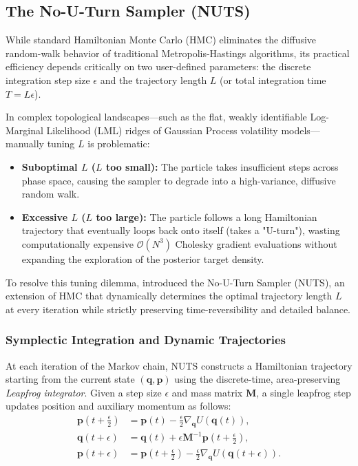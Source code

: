 \documentclass[12pt,oneside]{report}
\theoremstyle{definition}
\theoremstyle{remark}
\begin{document}
\subsection{The No-U-Turn Sampler (NUTS)}
\label{subsec:nuts}

While standard Hamiltonian Monte Carlo (HMC) eliminates the diffusive random-walk behavior of traditional Metropolis-Hastings algorithms, its practical efficiency depends critically on two user-defined parameters: the discrete integration step size $\epsilon$ and the trajectory length $L$ (or total integration time $T = L\epsilon$). 

In complex topological landscapes—such as the flat, weakly identifiable Log-Marginal Likelihood (LML) ridges of Gaussian Process volatility models—manually tuning $L$ is problematic:
\begin{itemize}
    \item \textbf{Suboptimal $L$ ($L$ too small):} The particle takes insufficient steps across phase space, causing the sampler to degrade into a high-variance, diffusive random walk.
    \item \textbf{Excessive $L$ ($L$ too large):} The particle follows a long Hamiltonian trajectory that eventually loops back onto itself (takes a "U-turn"), wasting computationally expensive $\mathcal{O}(N^3)$ Cholesky gradient evaluations without expanding the exploration of the posterior target density.
\end{itemize}

To resolve this tuning dilemma, \citet{hoffman2014nuts} introduced the No-U-Turn Sampler (NUTS), an extension of HMC that dynamically determines the optimal trajectory length $L$ at every iteration while strictly preserving time-reversibility and detailed balance.

\subsubsection{Symplectic Integration and Dynamic Trajectories}

At each iteration of the Markov chain, NUTS constructs a Hamiltonian trajectory starting from the current state $(\mathbf{q}, \mathbf{p})$ using the discrete-time, area-preserving \emph{Leapfrog integrator}. Given a step size $\epsilon$ and mass matrix $\mathbf{M}$, a single leapfrog step updates position and auxiliary momentum as follows:
\begin{align}
    \mathbf{p}\left(t + \frac{\epsilon}{2}\right) &= \mathbf{p}(t) - \frac{\epsilon}{2} \nabla_{\mathbf{q}} U(\mathbf{q}(t)), \label{eq:leapfrog1} \\
    \mathbf{q}(t + \epsilon) &= \mathbf{q}(t) + \epsilon \mathbf{M}^{-1} \mathbf{p}\left(t + \frac{\epsilon}{2}\right), \label{eq:leapfrog2} \\
    \mathbf{p}(t + \epsilon) &= \mathbf{p}\left(t + \frac{\epsilon}{2}\right) - \frac{\epsilon}{2} \nabla_{\mathbf{q}} U(\mathbf{q}(t + \epsilon)). \label{eq:leapfrog3}
\end{align}
\end{document}
